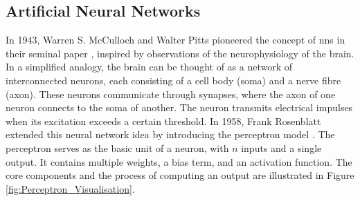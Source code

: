 \subsection{Artificial Neural Networks}
\label{sub:ANN}

In 1943, Warren S. McCulloch and Walter Pitts pioneered the concept of \glspl{nn} in their seminal paper \cite{mcculloch1943logical}, inspired by observations of the neurophysiology of the brain. In a simplified analogy, the brain can be thought of as a network of interconnected neurons, each consisting of a cell body (soma) and a nerve fibre (axon). These neurons communicate through synapses, where the axon of one neuron connects to the soma of another. The neuron transmits electrical impulses when its excitation exceeds a certain threshold.
\newline
\newline
In 1958, Frank Rosenblatt extended this neural network idea by introducing the perceptron model \citep{rosenblatt1958perceptron}. The perceptron serves as the basic unit of a neuron, with $n$ inputs and a single output. It contains multiple weights, a bias term, and an activation function. The core components and the process of computing an output are illustrated in Figure \ref{fig:Perceptron_Visualisation}.

